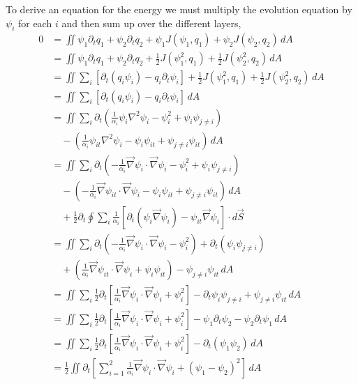 \documentclass[12pt]{article}
\begin{document}
    To derive an equation for the energy we must multiply the evolution equation by $\psi_i$ for each $i$ and then sum up over the different layers,
    \begin{align*}
      0 &= \iint \psi_1 \partial_t q_1 + \psi_2 \partial_t q_2 + \psi_1 J(\psi_1, q_1) + \psi_2 J(\psi_2, q_2) \, dA \\
       &= \iint \psi_1 \partial_t q_1 + \psi_2 \partial_t q_2 + \frac12 J(\psi_1^2, q_1) + \frac12 J(\psi_2^2, q_2) \, dA \\
       &= \iint \sum_i \left[\partial_t(q_i \psi_i) - q_i \partial_t\psi_i \right] + \frac12 J(\psi_1^2, q_1) + \frac12 J(\psi_2^2, q_2) \, dA \\
       &= \iint \sum_i \left[\partial_t(q_i \psi_i) - q_i \partial_t\psi_i \right] \, dA \\
       &= \iint \sum_i \partial_t \left (\frac{1}{\alpha_i}\psi_i \nabla^2 \psi_i - \psi_i^2 + \psi_i\psi_{j\ne i} \right) \\
        &\quad - \left( \frac{1}{\alpha_i} \psi_{it} \nabla^2 \psi_i - \psi_i \psi_{it} + \psi_{j \ne i} \psi_{it} \right) \, dA \\
       &= \iint \sum_i \partial_t \left (-\frac{1}{\alpha_i} \vec\nabla \psi_i \cdot \vec\nabla \psi_i - \psi_i^2 + \psi_i\psi_{j\ne i} \right) \\
        &\quad - \left( -\frac{1}{\alpha_i} \vec\nabla \psi_{it} \cdot \vec\nabla \psi_i - \psi_i \psi_{it} + \psi_{j \ne i} \psi_{it} \right) \, dA \\ 
        &\quad + \frac12 \partial_t \oint \sum_i \frac{1}{\alpha_i} \left[ \partial_t \left( \psi_i\vec\nabla\psi_i \right) - \psi_{it}\vec\nabla\psi_i\right] \cdot d\vec S \\
       &= \iint \sum_i \partial_t \left (-\frac{1}{\alpha_i} \vec\nabla \psi_i \cdot \vec\nabla \psi_i - \psi_i^2 \right) + \partial_t (\psi_i\psi_{j\ne i})  \\
        &\quad + \left( \frac{1}{\alpha_i} \vec\nabla \psi_{it} \cdot \vec\nabla \psi_i + \psi_i \psi_{it} \right) - \psi_{j \ne i} \psi_{it} \, dA \\
       &= \iint \sum_i \frac12 \partial_t \left[ \frac{1}{\alpha_i} \vec\nabla \psi_i \cdot \vec\nabla \psi_i + \psi_i^2 \right] - \partial_t \psi_i\psi_{j\ne i} + \psi_{j \ne i} \psi_{it} \, dA \\
       &= \iint  \sum_i \frac12 \partial_t \left[ \frac{1}{\alpha_i} \vec\nabla \psi_i \cdot  \vec\nabla \psi_i + \psi_i^2 \right] - \psi_1 \partial_t \psi_2  -  \psi_2 \partial_t \psi_1\, dA \\
       &= \iint  \sum_i \frac12 \partial_t \left[ \frac{1}{\alpha_i} \vec\nabla \psi_i \cdot  \vec\nabla \psi_i + \psi_i^2 \right] -  \partial_t (\psi_1\psi_2)\, dA \\
       &= \frac12 \iint \partial_t \left[ \sum_{i=1}^2 \frac{1}{\alpha_i} \vec\nabla \psi_i \cdot \vec\nabla \psi_i + (\psi_1 - \psi_2)^2 \right]\, dA
    \end{align*}
\end{document}
